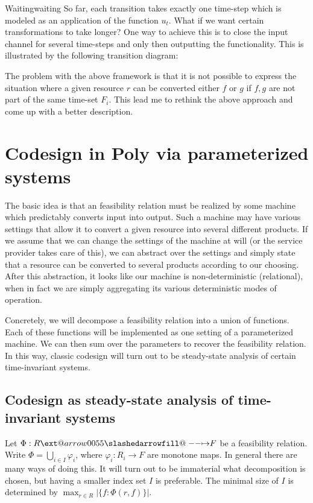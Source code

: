 \documentclass[12pt, a4paper]{article}
\makeatletter
\theoremstyle{definition}
\theoremstyle{plain}
\theoremstyle{plain}
\theoremstyle{plain}
\theoremstyle{plain}
\theoremstyle{plain}
\theoremstyle{remark}
\theoremstyle{remark}
\def\slashedarrowfill@#1#2#3#4#5{%
	$\m@th\thickmuskip0mu\medmuskip\thickmuskip\thinmuskip\thickmuskip
	\relax#5#1\mkern-7mu%
	\cleaders\hbox{$#5\mkern-2mu#2\mkern-2mu$}\hfill
	\mathclap{#3}\mathclap{#2}%
	\cleaders\hbox{$#5\mkern-2mu#2\mkern-2mu$}\hfill
	\mkern-7mu#4$%
}
\def\rightslashedarrowfill@{%
	\slashedarrowfill@\relbar\relbar\mapstochar\rightarrow}
\newcommand\xslashedrightarrow[2][]{%
	\ext@arrow 0055{\rightslashedarrowfill@}{#1}{#2}}
\newcommand{\prof}{\xslashedrightarrow{}}
\makeatother
\begin{document}
\begin{tcexample}{Waiting}{waiting}
    So far, each transition takes exactly one time-step which is modeled as an application of the function $u_t$. What if we want certain transformations to take longer? One way to achieve this is to close the input channel for several time-steps and only then outputting the functionality. This is illustrated by the following transition diagram:

\end{tcexample}

The problem with the above framework is that it is not possible to express the situation where a given resource $r$ can be converted either $f$ or $g$ if $f,g$ are not part of the same time-set $F_i$. This lead me to rethink the above approach and come up with a better description.

\section{Codesign in \textsf{Poly} via parameterized systems}
The basic idea is that an feasibility relation must be realized by some machine which predictably converts input into output. Such a machine may have various settings that allow it to convert a given resource into several different products. If we assume that we can change the settings of the machine at will (or the service provider takes care of this), we can abstract over the settings and simply state that a resource can be converted to several products according to our choosing. After this abstraction, it looks like our machine is non-deterministic (relational), when in fact we are simply aggregating its various deterministic modes of operation.

Concretely, we will decompose a feasibility relation into a union of functions. Each of these functions will be implemented as one setting of a parameterized machine. We can then sum over the parameters to recover the feasibility relation. In this way, classic codesign will turn out to be steady-state analysis of certain time-invariant systems.

\subsection{Codesign as steady-state analysis of time-invariant systems}
Let $\Phi: R \prof F$ be a feasibility relation. Write $\Phi = \bigcup_{i \in I} \varphi_i$, where $\varphi_i: R_i \rightarrow F$ are monotone maps. In general there are many ways of doing this. It will turn out to be immaterial what decomposition is chosen, but having a smaller index set $I$ is preferable. The minimal size of $I$ is determined by $\max_{r \in R}{| \{f : \Phi(r,f) \} |}$.
\end{document}
